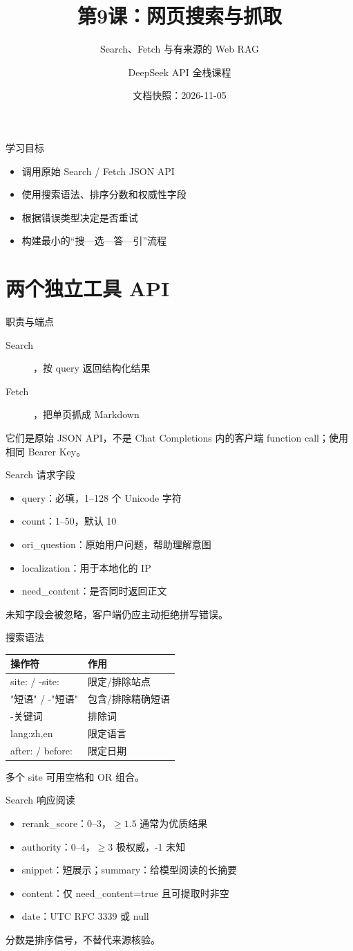 \documentclass[aspectratio=169,UTF8]{ctexbeamer}
\title{第9课：网页搜索与抓取}
\subtitle{Search、Fetch 与有来源的 Web RAG}
\author{DeepSeek API 全栈课程}
\date{文档快照：2026-11-05}
\begin{document}
\frame{\titlepage}
\begin{frame}{学习目标}
\begin{itemize}
  \item 调用原始 Search / Fetch JSON API
  \item 使用搜索语法、排序分数和权威性字段
  \item 根据错误类型决定是否重试
  \item 构建最小的“搜—选—答—引”流程
\end{itemize}
\end{frame}
\section{两个独立工具 API}
\begin{frame}{职责与端点}
\begin{description}
  \item[Search] ，按 query 返回结构化结果
  \item[Fetch] ，把单页抓成 Markdown
\end{description}
它们是原始 JSON API，不是 Chat Completions 内的客户端 function call；使用相同 Bearer Key。
\end{frame}
\begin{frame}{Search 请求字段}
\begin{itemize}
  \item query：必填，1--128 个 Unicode 字符
  \item count：1--50，默认 10
  \item ori\_question：原始用户问题，帮助理解意图
  \item localization：用于本地化的 IP
  \item need\_content：是否同时返回正文
\end{itemize}
未知字段会被忽略，客户端仍应主动拒绝拼写错误。
\end{frame}
\begin{frame}{搜索语法}
\begin{tabular}{ll}
\toprule
操作符 & 作用\\
\midrule
site: / -site: & 限定/排除站点\\
"短语" / -"短语" & 包含/排除精确短语\\
-关键词 & 排除词\\
lang:zh,en & 限定语言\\
after: / before: & 限定日期\\
\bottomrule
\end{tabular}
多个 site 可用空格和 OR 组合。
\end{frame}
\begin{frame}{Search 响应阅读}
\begin{itemize}
  \item rerank\_score：0--3，$\ge 1.5$ 通常为优质结果
  \item authority：0--4，$\ge 3$ 极权威，-1 未知
  \item snippet：短展示；summary：给模型阅读的长摘要
  \item content：仅 need\_content=true 且可提取时非空
  \item date：UTC RFC 3339 或 null
\end{itemize}
分数是排序信号，不替代来源核验。
\end{frame}
\end{document}
